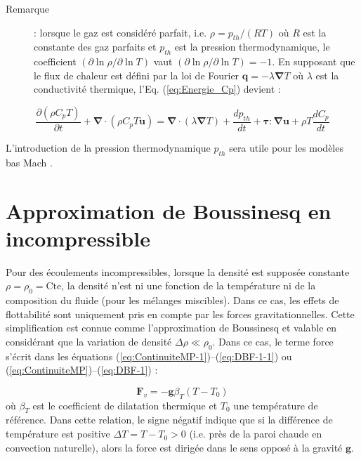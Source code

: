 \begin{description}
\item [{Remarque}] : lorsque le gaz est consid\'er\'e parfait, i.e. $\rho=p_{th}/(RT)$
o\`u $R$ est la constante des gaz parfaits et $p_{th}$ est la pression
thermodynamique, le coefficient $(\partial\ln\rho/\partial\ln T)$
vaut $(\partial\ln\rho/\partial\ln T)=-1$. En supposant que le flux
de chaleur est d\'efini par la loi de Fourier $\mathbf{q}=-\lambda\boldsymbol{\nabla}T$
o\`u $\lambda$ est la conductivit\'e thermique, l'Eq. (\ref{eq:Energie_Cp})
devient :
\end{description}
\begin{equation}
\frac{\partial(\rho C_{p}T)}{\partial t}+\boldsymbol{\nabla}\cdot(\rho C_{p}T\mathbf{u})=\boldsymbol{\nabla}\cdot(\lambda\boldsymbol{\nabla}T)+\frac{dp_{th}}{dt}+\boldsymbol{\tau}:\boldsymbol{\nabla}\mathbf{u}+\rho T\frac{dC_{p}}{dt}\label{eq:Energie_Cp-1}
\end{equation}


L'introduction de la pression thermodynamique $p_{th}$ sera utile
pour les mod\`eles \og bas Mach \fg{}.

\newpage
\chapter{Approximation de Boussinesq en incompressible}
Pour des \'ecoulements incompressibles, lorsque la densit\'e est suppos\'ee
constante $\rho=\rho_{0}=\mbox{Cte}$, la densit\'e n'est ni une fonction
de la temp\'erature ni de la composition du fluide (pour les m\'elanges
miscibles). Dans ce cas, les effets de flottabilit\'e sont uniquement
pris en compte par les forces gravitationnelles. Cette simplification
est connue comme l'\og approximation de Boussinesq \fg{} et valable
en consid\'erant que la variation de densit\'e $\Delta\rho\ll\rho_{0}$.
Dans ce cas, le terme force s'\'ecrit dans les \'equations (\ref{eq:ContinuiteMP-1})--(\ref{eq:DBF-1-1})
ou (\ref{eq:ContinuiteMP})--(\ref{eq:DBF-1}) :

\begin{equation}
\mathbf{F}_{v}=-\mathbf{g}\beta_{T}(T-T_{0})\label{eq:ApproxBoussinesq}
\end{equation}
o\`u $\beta_{T}$ est le coefficient de dilatation thermique et $T_{0}$
une temp\'erature de r\'ef\'erence. Dans cette relation, le signe n\'egatif
indique que si la diff\'erence de temp\'erature est positive $\Delta T=T-T_{0}>0$
(i.e. pr\`es de la paroi chaude en convection naturelle), alors la force
est dirig\'ee dans le sens oppos\'e \`a la gravit\'e $\mathbf{g}$.


